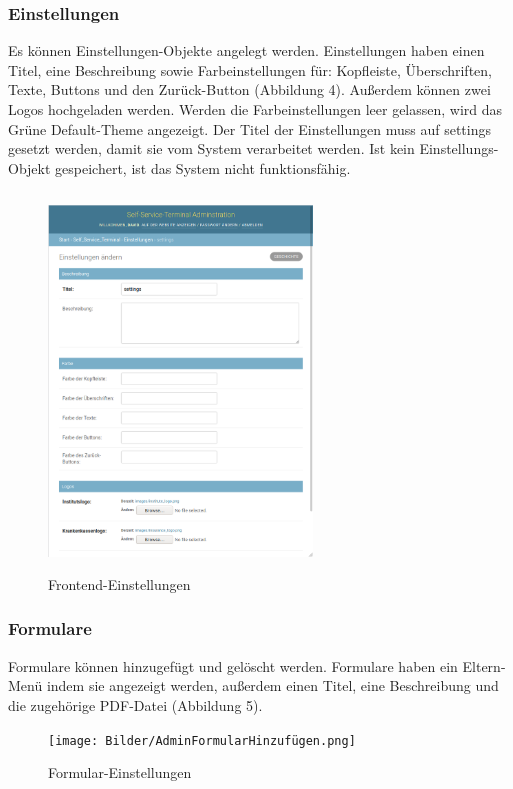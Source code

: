 \newpage

\subsubsection{Einstellungen} Es können Einstellungen-Objekte angelegt werden. Einstellungen haben einen Titel, eine Beschreibung sowie Farbeinstellungen für: Kopfleiste, Überschriften, Texte, Buttons und den Zurück-Button (Abbildung 4). Außerdem können zwei Logos hochgeladen werden. Werden die Farbeinstellungen leer gelassen, wird das Grüne Default-Theme angezeigt. Der Titel der Einstellungen muss auf \glqq settings\grqq{} gesetzt werden, damit sie vom System verarbeitet werden. Ist kein Einstellungs-Objekt gespeichert, ist das System nicht funktionsfähig.

\begin{figure}[htp]
    \centering
    \includegraphics[width=7cm , height=10cm]{Bilder/AdminEinstellungen.png}
    \caption[Startseite des Self-Service-Terminals]{Frontend-Einstellungen}
    \label{fig:SSTAdminFrontend}
\end{figure}

\newpage

\subsubsection{Formulare} Formulare können hinzugefügt und gelöscht werden. Formulare haben ein Eltern-Menü indem sie angezeigt werden, außerdem einen Titel, eine Beschreibung und die zugehörige PDF-Datei (Abbildung 5).

\begin{figure}[htp]
    \centering
    \texttt{[image: Bilder/AdminFormularHinzufügen.png]}
    \caption[Startseite des Self-Service-Terminals]{Formular-Einstellungen}
    \label{fig:SSTAdminFormular}
\end{figure}

